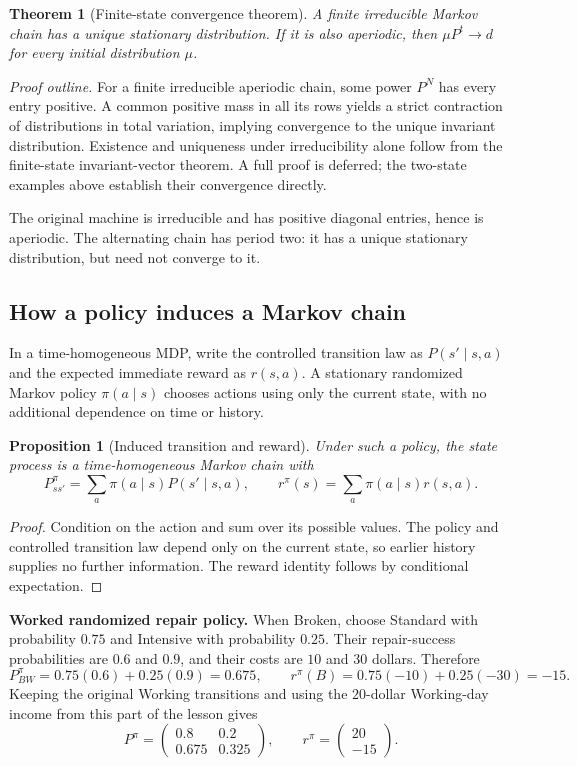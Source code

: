 \documentclass[11pt]{article}
\newtheorem{theorem}[definition]{Theorem}
\newtheorem{proposition}[definition]{Proposition}
\theoremstyle{remark}\newtheorem{remark}[definition]{Remark}
\begin{document}
\begin{theorem}[Finite-state convergence theorem]
A finite irreducible Markov chain has a unique stationary distribution. If it is also aperiodic, then $\mu P^t\to d$ for every initial distribution $\mu$.
\end{theorem}
\textit{Proof outline.} For a finite irreducible aperiodic chain, some power $P^N$ has every entry positive. A common positive mass in all its rows yields a strict contraction of distributions in total variation, implying convergence to the unique invariant distribution. Existence and uniqueness under irreducibility alone follow from the finite-state invariant-vector theorem. A full proof is deferred; the two-state examples above establish their convergence directly.

The original machine is irreducible and has positive diagonal entries, hence is aperiodic. The alternating chain has period two: it has a unique stationary distribution, but need not converge to it.

\clearpage
\subsection{How a policy induces a Markov chain}
In a time-homogeneous MDP, write the controlled transition law as $P(s'\mid s,a)$ and the expected immediate reward as $r(s,a)$. A stationary randomized Markov policy $\pi(a\mid s)$ chooses actions using only the current state, with no additional dependence on time or history.
\begin{proposition}[Induced transition and reward]
Under such a policy, the state process is a time-homogeneous Markov chain with
\[
\boxed{P^\pi_{ss'}=\sum_a\pi(a\mid s)P(s'\mid s,a),\qquad
r^\pi(s)=\sum_a\pi(a\mid s)r(s,a).}
\]
\end{proposition}
\begin{proof}
Condition on the action and sum over its possible values. The policy and controlled transition law depend only on the current state, so earlier history supplies no further information. The reward identity follows by conditional expectation.
\end{proof}
\textbf{Worked randomized repair policy.} When Broken, choose Standard with probability $0.75$ and Intensive with probability $0.25$. Their repair-success probabilities are $0.6$ and $0.9$, and their costs are $10$ and $30$ dollars. Therefore
\[
P^\pi_{BW}=0.75(0.6)+0.25(0.9)=0.675,\qquad
r^\pi(B)=0.75(-10)+0.25(-30)=-15.
\]
Keeping the original Working transitions and using the $20$-dollar Working-day income from this part of the lesson gives
\[
P^\pi=\begin{pmatrix}0.8&0.2\\0.675&0.325\end{pmatrix},\qquad
r^\pi=\begin{pmatrix}20\\-15\end{pmatrix}.
\]
\end{document}
